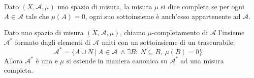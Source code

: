 \begin{definition}\label{CompletezzaMisura}
	Dato $(X,\mathcal A,\mu)$ uno spazio di misura, la misura $\mu$ si dice completa se per ogni $A\in\mathcal A$ tale che $\mu(A)=0$, ogni suo sottoinsieme è anch'esso appartenente ad $\mathcal A$.
\end{definition}

\begin{proposition}\label{CompletamentoMisura}
	Dato uno spazio di misura $(X,\mathcal A,\mu)$, chiamo $\mu$-completamento di $\mathcal A$ l'insieme $\mathcal A^*$ formato dagli elementi di $\mathcal A$ uniti con un sottoinsieme di un trascurabile:
	\begin{equation*}
		\mathcal A^*=\{A\cup N\ |\ A\in\mathcal A\ \wedge \exists B:\ N\subseteq B,\ \mu(B)=0\}
	\end{equation*}
	Allora $\mathcal A^*$ è una \sigalg{} e $\mu$ si estende in maniera canonica su $\mathcal A^*$ ad una misura completa.
\end{proposition}
